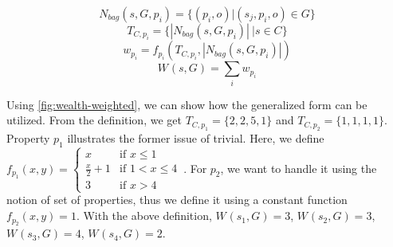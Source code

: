 \[
    N_{bag}(s,G,p_i) = \{(p_i,o) | (s_j, p_i, o) \in G\}
\]
\[
    T_{C,p_i} = \{|N_{bag}(s,G,p_i)|\ | s \in C\}
\]
\[
    w_{p_i} = f_{p_i}(T_{C,p_i}, |N_{bag}(s,G,p_i)|)
\]
\[
    W_{}(s, G) = \sum_i w_{p_i}
\]

Using \autoref{fig:wealth-weighted}, we can show how the generalized form can be utilized. From the definition, we get \(T_{C,p_1} = \{2, 2, 5, 1\}\) and \(T_{C,p_2} = \{1, 1, 1, 1\}\). Property \(p_1\) illustrates the former issue of trivial. Here, we define $f_{p_1}(x,y) = \begin{cases}
      x & \text{if }x \leq 1 \\
      \frac{x}{2} + 1 & \text{if }1 < x \leq 4 \\
      3 & \text{if }x > 4
    \end{cases}\, $.
For \(p_2\), we want to handle it using the notion of set of properties, thus we define it using a constant function \(f_{p_2}(x,y) = 1\).
With the above definition, \(W_{}(s_1, G) = 3\), \(W_{}(s_2, G) = 3\), \(W_{}(s_3, G) = 4\), \(W_{}(s_4, G) = 2\).